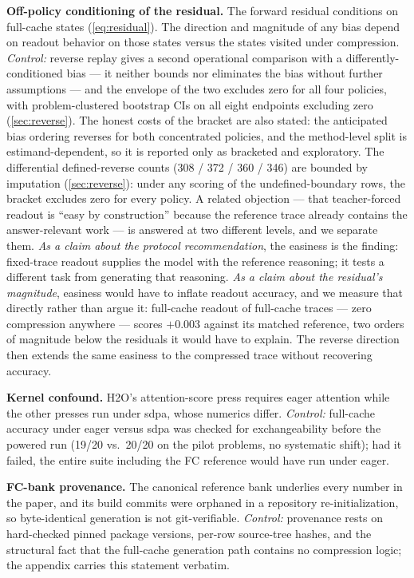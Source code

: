 \documentclass{article}
\begin{document}
\textbf{Off-policy conditioning of the residual.} The forward residual conditions on full-cache states (\cref{eq:residual}). The direction and magnitude of any bias depend on readout behavior on those states versus the states visited under compression. \emph{Control:} reverse replay gives a second operational comparison with a differently-conditioned bias --- it neither bounds nor eliminates the bias without further assumptions --- and the envelope of the two excludes zero for all four policies, with problem-clustered bootstrap CIs on all eight endpoints excluding zero (\cref{sec:reverse}). The honest costs of the bracket are also stated: the anticipated bias ordering reverses for both concentrated policies, and the method-level split is estimand-dependent, so it is reported only as bracketed and exploratory. The differential defined-reverse counts (308 / 372 / 360 / 346) are bounded by imputation (\cref{sec:reverse}): under any scoring of the undefined-boundary rows, the bracket excludes zero for every policy. A related objection --- that teacher-forced readout is ``easy by construction'' because the reference trace already contains the answer-relevant work --- is answered at two different levels, and we separate them. \emph{As a claim about the protocol recommendation}, the easiness is the finding: fixed-trace readout supplies the model with the reference reasoning; it tests a different task from generating that reasoning. \emph{As a claim about the residual's magnitude}, easiness would have to inflate readout accuracy, and we measure that directly rather than argue it: full-cache readout of full-cache traces --- zero compression anywhere --- scores $+0.003$ against its matched reference, two orders of magnitude below the residuals it would have to explain. The reverse direction then extends the same easiness to the compressed trace without recovering accuracy.

\textbf{Kernel confound.} H2O's attention-score press requires eager attention while the other presses run under sdpa, whose numerics differ. \emph{Control:} full-cache accuracy under eager versus sdpa was checked for exchangeability before the powered run (19/20 vs.\ 20/20 on the pilot problems, no systematic shift); had it failed, the entire suite including the FC reference would have run under eager.

\textbf{FC-bank provenance.} The canonical reference bank underlies every number in the paper, and its build commits were orphaned in a repository re-initialization, so byte-identical generation is not git-verifiable. \emph{Control:} provenance rests on hard-checked pinned package versions, per-row source-tree hashes, and the structural fact that the full-cache generation path contains no compression logic; the appendix carries this statement verbatim.
\end{document}
